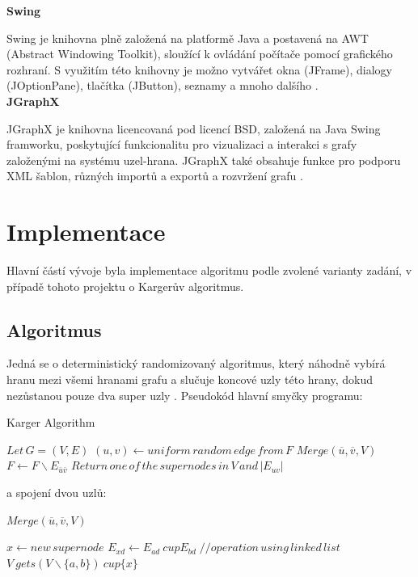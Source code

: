 \documentclass[../projekt.tex]{subfiles}
\begin{document}
\noindent\textbf{Swing} 

Swing je knihovna plně založená na platformě Java a postavená na AWT (Abstract Windowing Toolkit), sloužící k ovládání počítače pomocí grafického rozhraní. S využitím této knihovny je možno vytvářet okna (JFrame), dialogy (JOptionPane), tlačítka (JButton), seznamy  a mnoho dalšího \cite{swing}. \\


\noindent\textbf{JGraphX} 

JGraphX je knihovna licencovaná pod licencí BSD, založená na Java Swing framworku, poskytující funkcionalitu pro vizualizaci a interakci s grafy založenými na systému uzel-hrana. JGraphX také obsahuje funkce pro podporu XML šablon, různých importů a exportů a rozvržení grafu \cite{jgraphx}.






\section{Implementace}

Hlavní částí vývoje byla implementace algoritmu podle zvolené varianty zadání, v případě tohoto projektu o Kargerův algoritmus. 

\subsection{Algoritmus}

Jedná se o deterministický randomizovaný algoritmus, který náhodně vybírá hranu mezi všemi hranami grafu a slučuje koncové uzly této hrany, dokud nezůstanou pouze dva super uzly \cite{karger}. Pseudokód hlavní smyčky programu: \\ 


\begin{algorithm}
\caption{Karger Algorithm}\label{euclid}
\begin{algorithmic}[1]
\State $Let \, G = (V, E)$
\State $(u, v) \gets uniform\, random\, edge\, from\, F$
\State $Merge(\overline{u}, \overline{v}, V)$
\State $F \gets F\backslash E_{\overline{u}\overline{v}}$
\EndWhile
\State $Return\, one\, of \,the\, supernodes\, in\, V \,and \,|E_{uv}|$
\end{algorithmic}
\end{algorithm}

\noindent a spojení dvou uzlů: \\

\begin{algorithm}
\caption{$Merge(\overline{u}, \overline{v}, V)$}\label{euclid}
\begin{algorithmic}[1]
\State $x \gets new \, supernode$
\State $E_{xd} \gets E_{ad} \ cup E_{bd} \; //operation \, using \, linked \, list$ 
\State $V \ gets (V \backslash \{a,b\}) \ cup \{x\}$
\EndFor

\end{algorithmic}
\end{algorithm}
\end{document}
